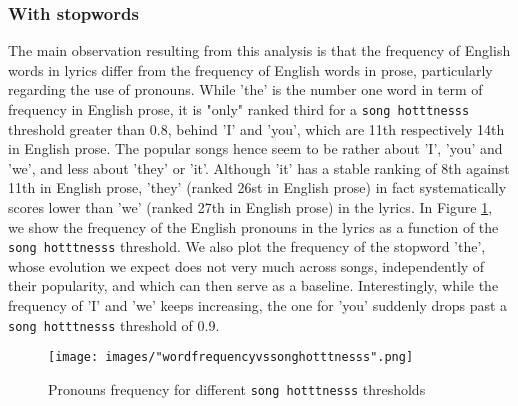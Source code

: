 \documentclass[11pt]{article}
\renewcommand\_{\textunderscore\allowbreak}
\begin{document}
\subsubsection{With stopwords}
The main observation resulting from this analysis is that the frequency of English words in lyrics differ from the frequency of English words in prose, particularly regarding the use of pronouns.
While 'the' is the number one word in term of frequency in English prose, it is "only" ranked third for a \texttt{song hotttnesss} threshold greater than 0.8, behind 'I' and 'you', which are 11th respectively 14th in English prose.
The popular songs hence seem to be rather about 'I', 'you' and 'we', and less about 'they' or 'it'.
Although 'it' has a stable ranking of 8th against 11th in English prose, 'they' (ranked 26st in English prose) in fact systematically scores lower than 'we' (ranked 27th in English prose) in the lyrics.
In Figure \ref{fig:word_frequency_stopwords}, we show the frequency of the English pronouns in the lyrics as a function of the \texttt{song hotttnesss} threshold.
We also plot the frequency of the stopword 'the', whose evolution we expect does not very much across songs, independently of their popularity, and which can then serve as a baseline.
Interestingly, while the frequency of 'I' and 'we' keeps increasing, the one for 'you' suddenly drops past a \texttt{song hotttnesss} threshold of 0.9.


\begin{figure}[h!]
\centering
\captionsetup{width=1.0\textwidth}
\texttt{[image: images/"word\_frequency\_vs\_song\_hotttnesss".png]}
\caption{Pronouns frequency for different \texttt{song hotttnesss} thresholds}
\label{fig:word_frequency_stopwords}
\end{figure}
\end{document}
